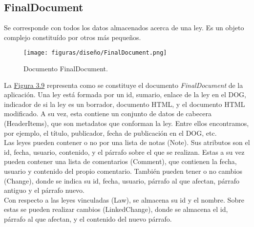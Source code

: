 \subsection{FinalDocument}

Se corresponde con todos los datos almacenados acerca de una ley. Es un objeto complejo constituído por otros más pequeños.

\begin{figure}[H]
\centerline{\texttt{[image: figuras/diseño/FinalDocument.png]}}
\caption{Documento FinalDocument.}
\label{enlaceFinalDocument}
\end{figure}

La \hyperref[enlaceFinalDocument]{Figura 3.9} representa como se constituye el documento {\it FinalDocument} de la aplicación. Una ley está formada por un id, sumario, enlace de la ley en el DOG, indicador de si la ley es un borrador, documento HTML, y el documento HTML modificado. A su vez, esta contiene un conjunto de datos de cabecera (HeaderItems), que son metadatos que conforman la ley. Entre ellos encontramos, por ejemplo, el título, publicador, fecha de publicación en el DOG, etc.
\\

Las leyes pueden contener o no por una lista de notas (Note). Sus atributos son el id, fecha, usuario, contenido, y el párrafo sobre el que se realizan. Estas a su vez pueden contener una lista de comentarios (Comment), que contienen la fecha, usuario y contenido del propio comentario. También pueden tener o no cambios (Change), donde se indica su id, fecha, usuario, párrafo al que afectan, párrafo antiguo y el párrafo nuevo.
\\

Con respecto a las leyes vinculadas (Law), se almacena su id y el nombre. Sobre estas se pueden realizar cambios (LinkedChange), donde se almacena el id, párrafo al que afectan, y el contenido del nuevo párrafo.